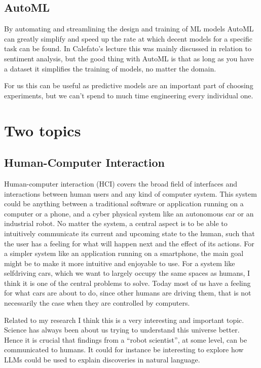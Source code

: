 \documentclass[11pt]{article}
\begin{document}
\subsection*{AutoML}
By automating and streamlining the design and training of ML models AutoML can greatly simplify and speed up the rate at which decent models for a specific task can be found. In Calefato's lecture this was mainly discussed in relation to sentiment analysis, but the good thing with AutoML is that as long as you have a dataset it simplifies the training of models, no matter the domain.

For us this can be useful as predictive models are an important part of choosing experiments, but we can't spend to much time engineering every individual one.

\section*{Two topics}
\subsection*{Human-Computer Interaction}
Human-computer interaction (HCI) covers the broad field of interfaces and interactions between human users and any kind of computer system. This system could be anything between a traditional software or application running on a computer or a phone, and a cyber physical system like an autonomous car or an industrial robot. No matter the system, a central aspect is to be able to intuitively communicate its current and upcoming state to the human, such that the user has a feeling for what will happen next and the effect of its actions. For a simpler system like an application running on a smartphone, the main goal might be to make it more intuitive and enjoyable to use. For a system like selfdriving cars, which we want to largely occupy the same spaces as humans, I think it is one of the central problems to solve. Today most of us have a feeling for what cars are about to do, since other humans are driving them, that is not necessarily the case when they are controlled by computers.

Related to my research I think this is a very interesting and important topic. Science has always been about us trying to understand this universe better. Hence it is crucial that findings from a ``robot scientist'', at some level, can be communicated to humans. It could for instance be interesting to explore how LLMs could be used to explain discoveries in natural language.
\end{document}
